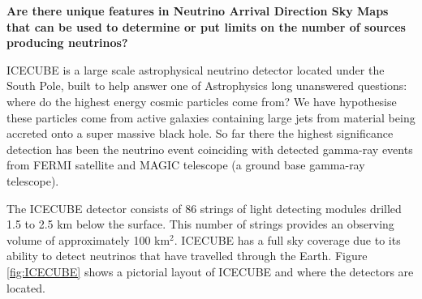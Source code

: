 \documentclass[a4paper,12pt,twoside]{article}
\begin{document}
\begin{center}
\large \textbf{Are there unique features in Neutrino Arrival Direction Sky Maps that can be used to determine or put limits on the number of sources producing neutrinos?}
\end{center}

\normalsize
ICECUBE is a large scale astrophysical neutrino detector located under the South Pole, built to help answer one of Astrophysics long unanswered questions: where do the highest energy cosmic particles come from? We have hypothesise these particles come from active galaxies containing large jets from material being accreted onto a super massive black hole. So far there the highest significance detection has been the neutrino event coinciding with detected gamma-ray events from FERMI satellite and MAGIC telescope (a ground base gamma-ray telescope). 

The ICECUBE detector consists of 86 strings of light detecting modules drilled 1.5 to 2.5 km below the surface. This number of strings provides an observing volume of approximately 100 km$^2$. ICECUBE has a full sky coverage due to its ability to detect neutrinos that have travelled through the Earth. Figure \ref{fig:ICECUBE} shows a pictorial layout of ICECUBE and where the detectors are located.
\end{document}
